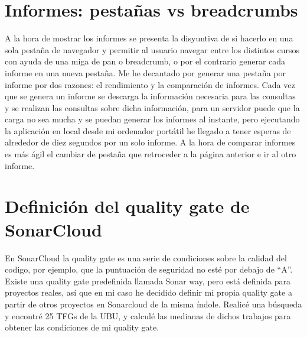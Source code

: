\section{Informes: pestañas vs breadcrumbs}
A la hora de mostrar los informes se presenta la disyuntiva de si hacerlo en una sola pestaña de navegador y permitir al usuario navegar entre los distintos cursos con ayuda de una miga de pan o breadcrumb, o por el contrario generar cada informe en una nueva pestaña. Me he decantado por generar una pestaña por informe por dos razones: el rendimiento y la comparación de informes. Cada vez que se genera un informe se descarga la información necesaria para las consultas y se realizan las consultas sobre dicha información, para un servidor puede que la carga no sea mucha y se puedan generar los informes al instante, pero ejecutando la aplicación en local desde mi ordenador portátil he llegado a tener esperas de alrededor de diez segundos por un solo informe. A la hora de comparar informes es más ágil el cambiar de pestaña que retroceder a la página anterior e ir al otro informe.

\section{Definición del quality gate de SonarCloud}
En SonarCloud la quality gate es una serie de condiciones sobre la calidad del codigo, por ejemplo, que la puntuación de seguridad no esté por debajo de ``A''. Existe una quality gate predefinida llamada Sonar way, pero está definida para proyectos reales, así que en mi caso he decidido definir mi propia quality gate a partir de otros proyectos en Sonarcloud de la misma índole. Realicé una búsqueda y encontré 25 TFGs de la UBU, y calculé las medianas de dichos trabajos para obtener las condiciones de mi quality gate.


